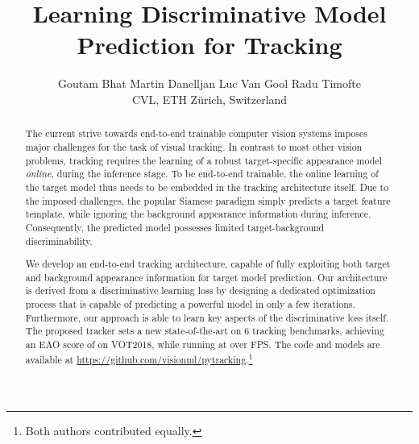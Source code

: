 \documentclass[10pt,twocolumn,letterpaper]{article}
\begin{document}
\title{Learning Discriminative Model Prediction for Tracking}

\newcommand{\asep}{\hspace{6mm}}
\newcommand{\aand}{\hspace{6mm}}
\author{Goutam Bhat  \aand  Martin Danelljan \aand Luc Van Gool \aand Radu Timofte \vspace{1.5mm}\\
	CVL, ETH Z\"urich, Switzerland
}

\maketitle


\newcommand{\parsection}[1]{\noindent\textbf{#1:} }

\begin{abstract}
	The current strive towards end-to-end trainable computer vision systems imposes major challenges for the task of visual tracking. In contrast to most other vision problems, tracking requires the learning of a robust target-specific appearance model \emph{online}, during the inference stage. To be end-to-end trainable, the online learning of the target model thus needs to be embedded in the tracking architecture itself. Due to the imposed challenges, the popular Siamese paradigm simply predicts a target feature template, while ignoring the background appearance information during inference. Consequently,  the predicted model possesses limited target-background discriminability.


We develop an end-to-end tracking architecture, capable of fully exploiting both target and background appearance information for target model prediction. Our architecture is derived from a discriminative learning loss by designing a dedicated optimization process that is capable of predicting a powerful model in only a few iterations. Furthermore, our approach is able to learn key aspects of the discriminative loss itself. The proposed tracker sets a new state-of-the-art on 6 tracking benchmarks, achieving an EAO score of  on VOT2018, while running at over  FPS. The code and models are available at \url{https://github.com/visionml/pytracking}.{\let\thefootnote\relax\footnote{{Both authors contributed equally.}}} \end{abstract}
\end{document}
